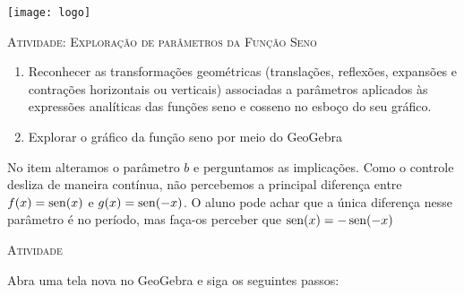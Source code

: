 \documentclass[10 pt,usenames,dvipsnames, oneside]{article}
\begin{document}
\begin{center}
  \begin{minipage}[l]{3cm}
\texttt{[image: logo]}    
\end{minipage}\hfill
\begin{minipage}[r]{.8\textwidth}
 {\Large \scshape Atividade: Exploração de parâmetros da Função Seno}  
\end{minipage}
\end{center}
\vspace{.2cm}

\ifdefined\prof

\begin{goals}
\begin{enumerate}
\item Reconhecer as transformações geométricas (translações,
reflexões, expansões e contrações horizontais ou verticais)
associadas a parâmetros aplicados às expressões analíticas
das funções seno e cosseno no esboço do seu gráfico.
\item Explorar o gráfico da função seno por meio do GeoGebra
\end{enumerate}

\tcblower

No item  alteramos o parâmetro $b$ e perguntamos as implicações. Como o controle desliza de maneira contínua, não percebemos a principal diferença entre $f(x) = \operatorname{sen}(x)$ e $g(x)= \operatorname{sen}(-x)$. O aluno pode achar que a única diferença nesse parâmetro é no período, mas faça-os perceber que $\operatorname{sen}(x)=-\operatorname{sen}(-x)$
\end{goals}

\bigskip
\begin{center}
{\large \scshape Atividade}
\end{center}
\fi

Abra uma tela nova no GeoGebra e siga os seguintes passos:
\end{document}
